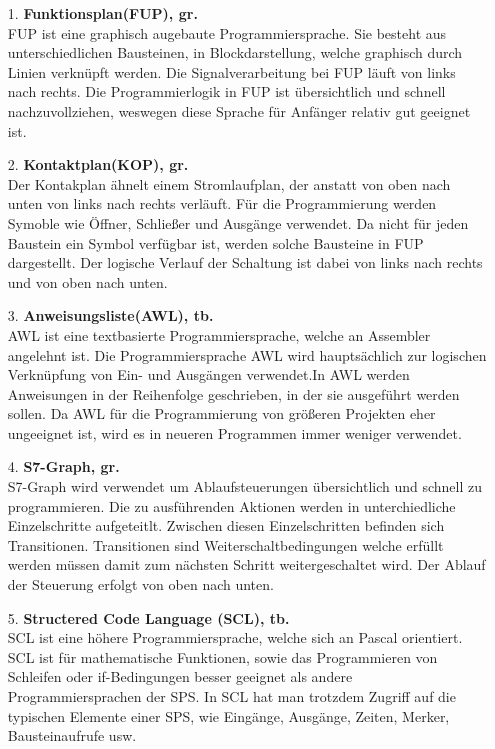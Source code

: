     \begin{itemize}
        \item [1.] \textbf{Funktionsplan(FUP), gr.} \\
            FUP ist eine graphisch augebaute Programmiersprache. Sie besteht aus unterschiedlichen Bausteinen, in Blockdarstellung, welche graphisch durch Linien verknüpft werden. Die Signalverarbeitung bei FUP läuft von links nach rechts. Die Programmierlogik in FUP ist übersichtlich und schnell nachzuvollziehen, weswegen diese Sprache für Anfänger relativ gut geeignet ist. 
            \cite{Programmiersprachen_der_SPS}

        \item[2.] \textbf{Kontaktplan(KOP), gr.} \\
            Der Kontakplan ähnelt einem Stromlaufplan, der anstatt von oben nach unten von links nach rechts verläuft. Für die Programmierung werden Symoble wie Öffner, Schließer und Ausgänge verwendet. Da nicht für jeden Baustein ein Symbol verfügbar ist, werden solche Bausteine in FUP dargestellt. Der logische Verlauf der Schaltung ist dabei von links nach rechts und von oben nach unten.
            \cite{Programmiersprachen_der_SPS}

        \item[3.] \textbf{Anweisungsliste(AWL), tb.}\\
            AWL ist eine textbasierte Programmiersprache, welche an Assembler angelehnt ist. Die Programmiersprache AWL wird hauptsächlich zur logischen Verknüpfung von Ein- und Ausgängen verwendet.In AWL werden Anweisungen in der Reihenfolge geschrieben, in der sie ausgeführt werden sollen. Da AWL für die Programmierung von größeren Projekten eher ungeeignet ist, wird es in neueren Programmen immer weniger verwendet.
            \cite{Anweisungsliste}

        \item[4.] \textbf{S7-Graph, gr.} \\
            S7-Graph wird verwendet um Ablaufsteuerungen übersichtlich und schnell zu programmieren. Die zu ausführenden Aktionen werden in unterchiedliche Einzelschritte aufgeteitlt. Zwischen diesen Einzelschritten befinden sich Transitionen. Transitionen sind Weiterschaltbedingungen welche erfüllt werden müssen damit zum nächsten Schritt weitergeschaltet wird. Der Ablauf der Steuerung erfolgt von oben nach unten. 

        \item[5.] \textbf{Structered Code Language (SCL), tb.} \\
            SCL ist eine höhere Programmiersprache, welche sich an Pascal orientiert. SCL ist für mathematische Funktionen, sowie das Programmieren von Schleifen oder if-Bedingungen besser geeignet als andere Programmiersprachen der SPS. In SCL hat man trotzdem Zugriff auf die typischen Elemente einer SPS, wie Eingänge, Ausgänge, Zeiten, Merker, Bausteinaufrufe usw.
            \cite{SCL}

    \end{itemize}


